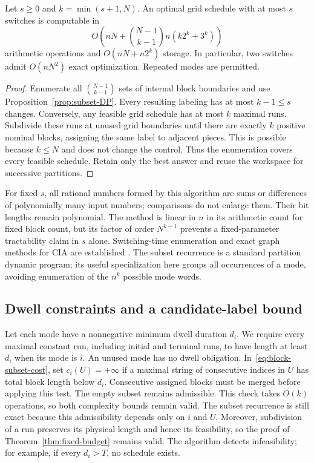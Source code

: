 \begin{theorem}\label{thm:fixed-budget}
Let $s\ge0$ and $k=\min(s+1,N)$. An optimal grid schedule with at most
$s$ switches is computable in
\begin{equation}\label{eq:fixed-budget-complexity}
 O\left(nN+\binom{N-1}{k-1}n(k2^k+3^k)\right)
\end{equation}
arithmetic operations and $O(nN+n2^k)$ storage. In particular, two switches
admit $O(nN^2)$ exact optimization. Repeated modes are permitted.
\end{theorem}
\begin{proof}
Enumerate all $\binom{N-1}{k-1}$ sets of internal block boundaries and use
Proposition~\ref{prop:subset-DP}. Every resulting labeling has at most
$k-1\le s$ changes. Conversely, any feasible grid schedule has at most $k$
maximal runs. Subdivide these runs at unused grid boundaries until there
are exactly $k$ positive nominal blocks, assigning the same label to adjacent
pieces. This is possible because $k\le N$ and does not change the control.
Thus the enumeration covers every feasible schedule. Retain only the best
answer and reuse the workspace for successive partitions.
\end{proof}

For fixed $s$, all rational numbers formed by this algorithm are sums or
differences of polynomially many input numbers; comparisons do not enlarge
them. Their bit lengths remain polynomial. The method is linear in $n$
in its arithmetic count for fixed block count, but its factor of order
$N^{k-1}$ prevents a fixed-parameter tractability claim in $s$ alone.
Switching-time enumeration and exact graph methods for CIA are established
\citep[Section~6.4.3]{zeile2021thesis}\citep{bestehorn2021shortest}.
The subset recurrence is a standard partition dynamic program; its useful
specialization here groups all occurrences of a mode, avoiding enumeration
of the $n^k$ possible mode words.

\subsection{Dwell constraints and a candidate-label bound}

Let each mode have a nonnegative minimum dwell duration $d_i$. We require
every maximal constant run, including initial and terminal runs, to have
length at least $d_i$ when its mode is $i$. An unused mode has no dwell
obligation. In~\eqref{eq:block-subset-cost}, set $c_i(U)=+\infty$ if a
maximal string of consecutive indices in $U$ has total block length below
$d_i$. Consecutive assigned blocks must be merged before applying this test.
The empty subset remains admissible. This check takes $O(k)$ operations,
so both complexity bounds remain valid. The subset recurrence is still
exact because this admissibility depends only on $i$ and $U$. Moreover,
subdivision of a run preserves its physical length and hence its feasibility,
so the proof of Theorem~\ref{thm:fixed-budget} remains valid. The algorithm
detects infeasibility; for example, if every $d_i>T$, no schedule exists.

